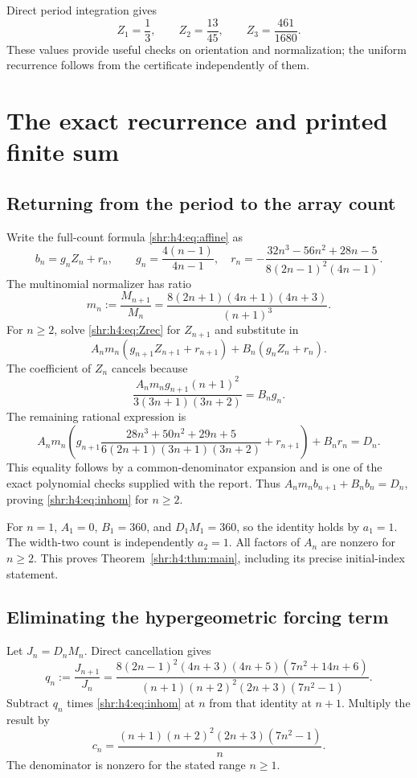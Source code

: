 \documentclass[11pt,letterpaper]{article}
\numberwithin{equation}{section}
\theoremstyle{definition}
\newcommand{\1}{\mathbf 1}
\begin{document}
Direct period integration gives
\[
 Z_1=\frac13,\qquad Z_2=\frac{13}{45},\qquad
 Z_3=\frac{461}{1680}.
\]
These values provide useful checks on orientation and normalization; the
uniform recurrence follows from the certificate independently of them.

\section{The exact recurrence and printed finite sum}
\label{shr:h4:sec:finite}
\subsection{Returning from the period to the array count}
Write the full-count formula \eqref{shr:h4:eq:affine} as
\[
 b_n=g_nZ_n+r_n,\qquad
 g_n=\frac{4(n-1)}{4n-1},\quad
 r_n=-\frac{32n^3-56n^2+28n-5}{8(2n-1)^2(4n-1)}.
\]
The multinomial normalizer has ratio
\begin{equation}
 m_n:=\frac{M_{n+1}}{M_n}
 =\frac{8(2n+1)(4n+1)(4n+3)}{(n+1)^3}.
 \label{shr:h4:eq:Mratio}
\end{equation}
For $n\ge2$, solve \eqref{shr:h4:eq:Zrec} for $Z_{n+1}$ and substitute in
\[
 A_nm_n(g_{n+1}Z_{n+1}+r_{n+1})+B_n(g_nZ_n+r_n).
\]
The coefficient of $Z_n$ cancels because
\[
 \frac{A_nm_ng_{n+1}(n+1)^2}{3(3n+1)(3n+2)}=B_ng_n.
\]
The remaining rational expression is
\begin{equation}
 A_nm_n\left(g_{n+1}
 \frac{28n^3+50n^2+29n+5}{6(2n+1)(3n+1)(3n+2)}+r_{n+1}\right)
 +B_nr_n=D_n.
 \label{shr:h4:eq:rationalreturn}
\end{equation}
This equality follows by a common-denominator expansion and is one of the
exact polynomial checks supplied with the report. Thus
$A_nm_nb_{n+1}+B_nb_n=D_n$, proving \eqref{shr:h4:eq:inhom} for $n\ge2$.

For $n=1$, $A_1=0$, $B_1=360$, and $D_1M_1=360$, so the identity holds
by $a_1=1$. The width-two count is independently $a_2=1$. All factors of
$A_n$ are nonzero for $n\ge2$. This proves Theorem~\ref{shr:h4:thm:main},
including its precise initial-index statement.

\subsection{Eliminating the hypergeometric forcing term}
Let $J_n=D_nM_n$. Direct cancellation gives
\begin{equation}
 q_n:=\frac{J_{n+1}}{J_n}
 =\frac{8(2n-1)^2(4n+3)(4n+5)(7n^2+14n+6)}
 {(n+1)(n+2)^2(2n+3)(7n^2-1)}.
 \label{shr:h4:eq:qforcing}
\end{equation}
Subtract $q_n$ times \eqref{shr:h4:eq:inhom} at $n$ from that identity at $n+1$.
Multiply the result by
\begin{equation}
 c_n=\frac{(n+1)(n+2)^2(2n+3)(7n^2-1)}n.
 \label{shr:h4:eq:elimmult}
\end{equation}
The denominator is nonzero for the stated range $n\ge1$.
\end{document}
